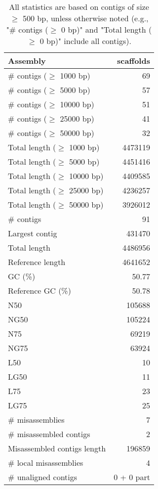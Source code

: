 \documentclass[12pt,a4paper]{article}
\begin{document}
\begin{table}[ht]
\begin{center}
\caption{All statistics are based on contigs of size $\geq$ 500 bp, unless otherwise noted (e.g., "\# contigs ($\geq$ 0 bp)" and "Total length ($\geq$ 0 bp)" include all contigs).}
\begin{tabular}{|l*{1}{|r}|}
\hline
Assembly & scaffolds \\ \hline
\# contigs ($\geq$ 1000 bp) & 69 \\ \hline
\# contigs ($\geq$ 5000 bp) & 57 \\ \hline
\# contigs ($\geq$ 10000 bp) & 51 \\ \hline
\# contigs ($\geq$ 25000 bp) & 41 \\ \hline
\# contigs ($\geq$ 50000 bp) & 32 \\ \hline
Total length ($\geq$ 1000 bp) & 4473119 \\ \hline
Total length ($\geq$ 5000 bp) & 4451416 \\ \hline
Total length ($\geq$ 10000 bp) & 4409585 \\ \hline
Total length ($\geq$ 25000 bp) & 4236257 \\ \hline
Total length ($\geq$ 50000 bp) & 3926012 \\ \hline
\# contigs & 91 \\ \hline
Largest contig & 431470 \\ \hline
Total length & 4486956 \\ \hline
Reference length & 4641652 \\ \hline
GC (\%) & 50.77 \\ \hline
Reference GC (\%) & 50.78 \\ \hline
N50 & 105688 \\ \hline
NG50 & 105224 \\ \hline
N75 & 69219 \\ \hline
NG75 & 63924 \\ \hline
L50 & 10 \\ \hline
LG50 & 11 \\ \hline
L75 & 23 \\ \hline
LG75 & 25 \\ \hline
\# misassemblies & 7 \\ \hline
\# misassembled contigs & 2 \\ \hline
Misassembled contigs length & 196859 \\ \hline
\# local misassemblies & 4 \\ \hline
\# unaligned contigs & 0 + 0 part \\ \hline

\end{tabular}
\end{center}
\end{table}
\end{document}
